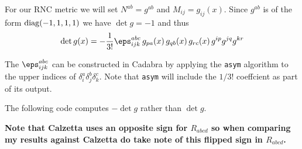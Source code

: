 \documentclass[12pt]{cdblatex}
\begin{document}
For our RNC metric we will set $N^{ab} = g^{ab}$ and $M_{ij} = g_{ij}(x)$. Since $g^{ab}$ is
of the form ${\rm diag}(-1,1,1,1)$ we have $\det g = -1$ and thus
\begin{align}
   \det g(x) = - \frac{1}{3!} \eps^{abc}_{ijk}\, g_{pa}(x)\, g_{qb}(x)\, g_{rc}(x)\, g^{ip} g^{jq} g^{kr}
\end{align}

The $\eps^{abc}_{ijk}$ can be constructed in Cadabra by applying the \verb|asym| algorithm
to the upper indices of $\delta^a_i \delta^b_j \delta^c_k$. Note that \verb|asym| will
include the $1/3!$ coeffcient as part of its output.

The following code computes $-\det g$ rather than $\det g$.

{\bf Note that Calzetta uses an opposite sign for $R_{abcd}$ so when comparing my results
against Calzetta do take note of this flipped sign in $R_{abcd}$.}

\clearpage
\end{document}
